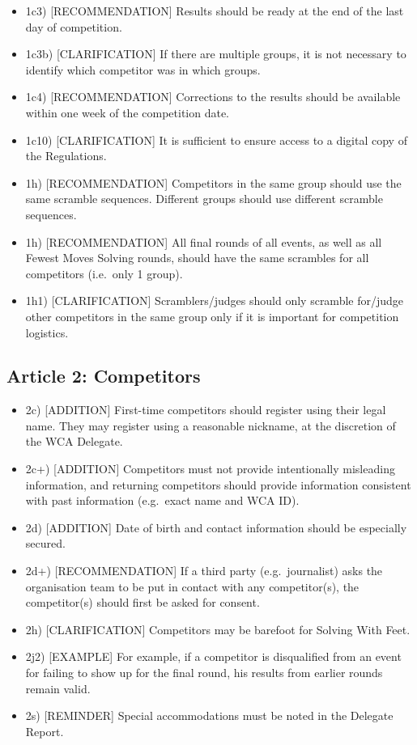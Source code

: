 \begin{itemize}
\item
  1c3) {[}RECOMMENDATION{]} Results should be ready at the end of the
  last day of competition.
\item
  1c3b) {[}CLARIFICATION{]} If there are multiple groups, it is not
  necessary to identify which competitor was in which groups.
\item
  1c4) {[}RECOMMENDATION{]} Corrections to the results should be
  available within one week of the competition date.
\item
  1c10) {[}CLARIFICATION{]} It is sufficient to ensure access to a
  digital copy of the Regulations.
\item
  1h) {[}RECOMMENDATION{]} Competitors in the same group should use the
  same scramble sequences. Different groups should use different
  scramble sequences.
\item
  1h) {[}RECOMMENDATION{]} All final rounds of all events, as well as
  all Fewest Moves Solving rounds, should have the same scrambles for
  all competitors (i.e.~only 1 group).
\item
  1h1) {[}CLARIFICATION{]} Scramblers/judges should only scramble
  for/judge other competitors in the same group only if it is important
  for competition logistics.
\end{itemize}

\subsection{ Article 2: Competitors}

\begin{itemize}
\item
  2c) {[}ADDITION{]} First-time competitors should register using their
  legal name. They may register using a reasonable nickname, at the
  discretion of the WCA Delegate.
\item
  2c+) {[}ADDITION{]} Competitors must not provide intentionally
  misleading information, and returning competitors should provide
  information consistent with past information (e.g.~exact name and WCA
  ID).
\item
  2d) {[}ADDITION{]} Date of birth and contact information should be
  especially secured.
\item
  2d+) {[}RECOMMENDATION{]} If a third party (e.g.~journalist) asks the
  organisation team to be put in contact with any competitor(s), the
  competitor(s) should first be asked for consent.
\item
  2h) {[}CLARIFICATION{]} Competitors may be barefoot for Solving With
  Feet.
\item
  2j2) {[}EXAMPLE{]} For example, if a competitor is disqualified from
  an event for failing to show up for the final round, his results from
  earlier rounds remain valid.
\item
  2s) {[}REMINDER{]} Special accommodations must be noted in the
  Delegate Report.
\end{itemize}

